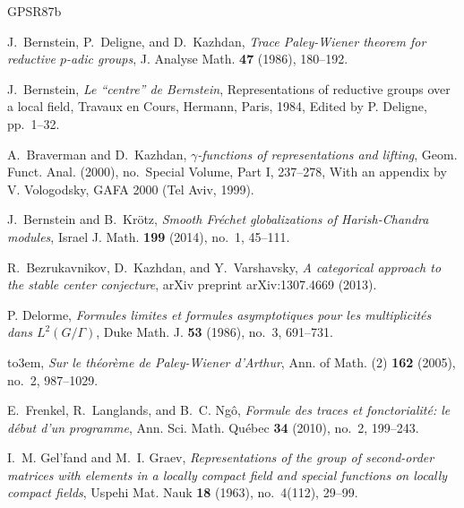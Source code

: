 \documentclass[iccmp]{ipbook}
\begin{document}
\newcommand{\etalchar}[1]{$^{#1}$}
\providecommand{\bysame}{\leavevmode\hbox to3em{\hrulefill}\thinspace}
\providecommand{\MR}{\relax\ifhmode\unskip\space\fi MR }
\providecommand{\MRhref}[2]{%
  \href{http://www.ams.org/mathscinet-getitem?mr=#1}{#2}
}
\providecommand{\href}[2]{#2}
\begin{thebibliography}{GPSR87b}

J.~Bernstein, P.~Deligne, and D.~Kazhdan, \emph{Trace {P}aley-{W}iener theorem
  for reductive {$p$}-adic groups}, J. Analyse Math. \textbf{47} (1986),
  180--192.

J.~Bernstein, \emph{Le ``centre'' de {B}ernstein}, Representations of reductive
  groups over a local field, Travaux en Cours, Hermann, Paris, 1984, Edited by
  P. Deligne, pp.~1--32.

A.~Braverman and D.~Kazhdan, \emph{{$\gamma$}-functions of representations and
  lifting}, Geom. Funct. Anal. (2000), no.~Special Volume, Part I, 237--278,
  With an appendix by V. Vologodsky, GAFA 2000 (Tel Aviv, 1999).

J.~Bernstein and B.~Kr\"{o}tz, \emph{Smooth {F}r\'{e}chet globalizations of
  {H}arish-{C}handra modules}, Israel J. Math. \textbf{199} (2014), no.~1,
  45--111.

R.~Bezrukavnikov, D.~Kazhdan, and Y.~Varshavsky, \emph{A categorical
  approach to the stable center conjecture}, arXiv preprint arXiv:1307.4669
  (2013).

P. Delorme, \emph{Formules limites et formules asymptotiques pour les
  multiplicit\'{e}s dans {$L^2(G/\Gamma)$}}, Duke Math. J. \textbf{53} (1986),
  no.~3, 691--731.

\bysame, \emph{Sur le th\'{e}or\`eme de {P}aley-{W}iener d'{A}rthur}, Ann. of
  Math. (2) \textbf{162} (2005), no.~2, 987--1029.

E.~Frenkel, R.~Langlands, and B.~C. Ng{\^o}, \emph{Formule des traces et
  fonctorialit\'{e}: le d\'{e}but d'un programme}, Ann. Sci. Math. Qu\'{e}bec
  \textbf{34} (2010), no.~2, 199--243.

I.~M. Gel'fand and M.~I. Graev, \emph{Representations of the group of
  second-order matrices with elements in a locally compact field and special
  functions on locally compact fields}, Uspehi Mat. Nauk \textbf{18} (1963),
  no.~4(112), 29--99.


\end{thebibliography}
\end{document}
